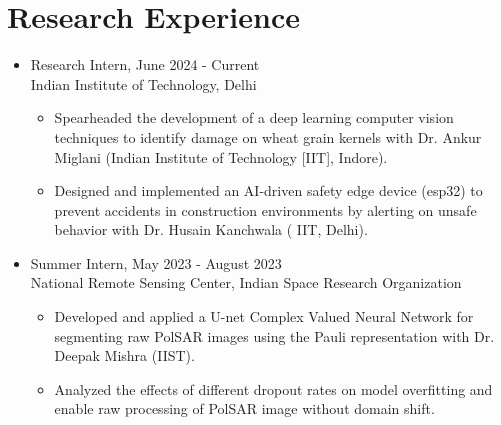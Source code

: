 \documentclass[11pt]{article}
\begin{document}
	\section*{\bf Research Experience}
	\begin{itemize}[leftmargin=*,noitemsep,topsep=0pt]
		
		\item Research Intern, \hfill June 2024 - Current \\
		Indian Institute of Technology, Delhi
		\begin{itemize}[leftmargin=*,noitemsep,topsep=0pt]
			\item Spearheaded the development of a deep learning computer vision techniques to identify damage on wheat grain kernels with Dr. Ankur Miglani (Indian Institute of Technology [IIT], Indore).
			\item Designed and implemented an AI-driven safety edge device (esp32) to prevent accidents in construction environments by alerting on unsafe behavior with Dr. Husain Kanchwala ( IIT, Delhi).
		\end{itemize}
		
		
		\item Summer Intern, \hfill May 2023 - August 2023\\
		National Remote Sensing Center, Indian Space Research Organization
		
		\begin{itemize}[leftmargin=*,noitemsep,topsep=0pt]			
			\item Developed and applied a U-net Complex Valued Neural Network for segmenting raw PolSAR images using the Pauli representation with Dr. Deepak Mishra (IIST).
			 \item Analyzed the effects of  different dropout rates on model overfitting and enable raw processing of PolSAR image without domain shift. 
		\end{itemize}
		

\end{itemize}
\end{document}
